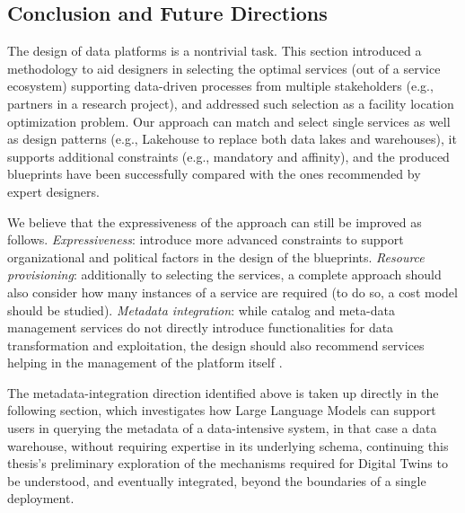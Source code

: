 \subsection{Conclusion and Future Directions}
\label{sec:pdd-conclusion}

The design of data platforms is a nontrivial task. {\color{red}This section} introduced a methodology to aid designers in selecting the optimal services (out of a service ecosystem) supporting data-driven processes from multiple stakeholders (e.g., partners in a research project), and addressed such selection as a facility location optimization problem. Our approach can match and select single services as well as design patterns (e.g., Lakehouse to replace both data lakes and warehouses), it supports additional constraints (e.g., mandatory and affinity), and the produced blueprints have been successfully compared with the ones recommended by expert designers.

We believe that the expressiveness of the approach can still be improved as follows. \textit{Expressiveness}: introduce more advanced constraints to support organizational and political factors in the design of the blueprints. \textit{Resource provisioning}: additionally to selecting the services, a complete approach should also consider how many instances of a service are required (to do so, a cost model should be studied). \textit{Metadata integration}: while catalog and meta-data management services do not directly introduce functionalities for data transformation and exploitation, the design should also recommend services helping in the management of the platform itself \cite{francia2021moses}.

{\color{red}
The metadata-integration direction identified above is taken up directly in the following section, which investigates how Large Language Models can support users in querying the metadata of a data-intensive system, in that case a data warehouse, without requiring expertise in its underlying schema, continuing this thesis's preliminary exploration of the mechanisms required for Digital Twins to be understood, and eventually integrated, beyond the boundaries of a single deployment.
}